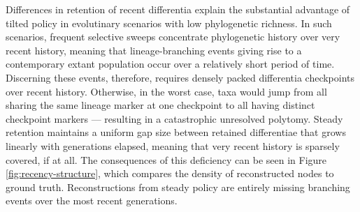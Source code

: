 

Differences in retention of recent differentia explain the substantial advantage of tilted policy in evolutinary scenarios with low phylogenetic richness.
In such scenarios, frequent selective sweeps concentrate phylogenetic history over very recent history, meaning that lineage-branching events giving rise to a contemporary extant population occur over a relatively short period of time.
Discerning these events, therefore, requires densely packed differentia checkpoints over recent history.
Otherwise, in the worst case, taxa would jump from all sharing the same lineage marker at one checkpoint to all having distinct checkpoint markers --- resulting in a catastrophic unresolved polytomy.
Steady retention maintains a uniform gap size between retained differentiae that grows linearly with generations elapsed, meaning that very recent history is sparsely covered, if at all.
The consequences of this deficiency can be seen in Figure \ref{fig:recency-structure}, which compares the density of reconstructed nodes to ground truth.
Reconstructions from steady policy are entirely missing branching events over the most recent generations.


% 


